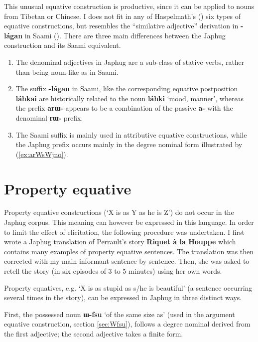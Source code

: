 \documentclass[oneside,a4paper,11pt]{article}
\newcommand{\ipa}[1]{{\phon\textbf{#1}}}
\newcommand{\forme}[2]{\ipa{#1} `#2'}
\begin{document}
This unusual equative construction is productive, since it can be applied to nouns from Tibetan or Chinese. I does not fit in any of Haspelmath's (\citeyear{haspelmath17equative}) six types of equative constructions, but resembles the ``similative adjective'' derivation in \ipa{-lágan} in Saami (\citealt[5.1]{ylikovski17similarity}). There are three main differences between the Japhug construction and its Saami equivalent.

\begin{enumerate}
\item The denominal adjectives in Japhug are a sub-class of stative verbs, rather than being noun-like as in Saami.
\item The suffix \ipa{-lágan} in Saami, like the corresponding equative postposition \ipa{láhkai} are historically related to the noun \ipa{láhki} ‘mood, manner’, whereas the prefix \ipa{arɯ-} appears to be a combination of the passive \ipa{a-} with the denominal \ipa{rɯ-} prefix.
\item The Saami suffix is mainly used in attributive equative constructions, while the Japhug prefix occurs mainly in the degree nominal form illustrated by (\ref{ex:arWsWjno}).
\end{enumerate}



\section{Property equative} \label{sec:pred.equative}
Property equative constructions (`X is as Y as he is Z') do not occur in the Japhug corpus. This meaning can however be expressed in this language. In order to limit the effect of elicitation, the following procedure was undertaken. I first wrote a Japhug translation of Perrault's story \textbf{Riquet à la Houppe} which contains many examples of property equative sentences. The translation was then corrected with my main informant sentence by sentence. Then, she was asked to retell the story (in six episodes of 3 to 5 minutes) using her own words.

Property equatives, e.g. `X is as stupid as s/he is beautiful' (a sentence occurring several times in the story), can be expressed in Japhug in three distinct ways.

First, the possessed noun \forme{ɯ-fsu}{of the same size as} (used in the argument equative construction, section \ref{sec:Wfsu}), follows a degree nominal derived from the first adjective; the second adjective takes a finite form.
\end{document}
